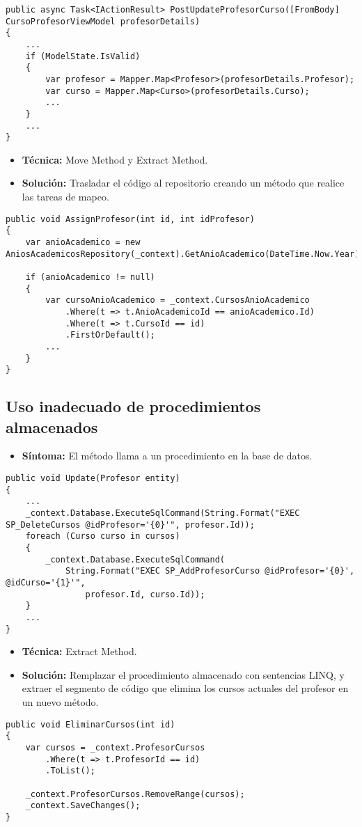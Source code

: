 \begin{lstlisting}[language={[Sharp]C}]
public async Task<IActionResult> PostUpdateProfesorCurso([FromBody] CursoProfesorViewModel profesorDetails)
{
	...
	if (ModelState.IsValid)
	{
		var profesor = Mapper.Map<Profesor>(profesorDetails.Profesor);
		var curso = Mapper.Map<Curso>(profesorDetails.Curso);
		...
	}
	...
}
\end{lstlisting}

\begin{itemize}
	\item \textbf{Técnica:} Move Method y Extract Method.
	\item \textbf{Solución:} Trasladar el código al repositorio creando un método que realice las tareas de mapeo.
\end{itemize}

\begin{lstlisting}[language={[Sharp]C}]
public void AssignProfesor(int id, int idProfesor)
{
	var anioAcademico = new AniosAcademicosRepository(_context).GetAnioAcademico(DateTime.Now.Year);

	if (anioAcademico != null)
	{
		var cursoAnioAcademico = _context.CursosAnioAcademico
			.Where(t => t.AnioAcademicoId == anioAcademico.Id)
			.Where(t => t.CursoId == id)
			.FirstOrDefault();	
		...
	}
}
\end{lstlisting}


\subsection{Uso inadecuado de procedimientos almacenados}
\begin{itemize}
	\item \textbf{Síntoma:} El método llama a un procedimiento en la base de datos.
\end{itemize}

\begin{lstlisting}[language={[Sharp]C}]
public void Update(Profesor entity)
{
	...
	_context.Database.ExecuteSqlCommand(String.Format("EXEC SP_DeleteCursos @idProfesor='{0}'", profesor.Id));
	foreach (Curso curso in cursos)
	{
    	_context.Database.ExecuteSqlCommand(
    		String.Format("EXEC SP_AddProfesorCurso @idProfesor='{0}', @idCurso='{1}'", 
    			profesor.Id, curso.Id));
	}
	...
}
\end{lstlisting}

\begin{itemize}
	\item \textbf{Técnica:} Extract Method.
	\item \textbf{Solución:} Remplazar el procedimiento almacenado con sentencias LINQ, y extraer el segmento de código que elimina los cursos actuales del profesor en un nuevo método.
\end{itemize}

\begin{lstlisting}[language={[Sharp]C}]
public void EliminarCursos(int id)
{
	var cursos = _context.ProfesorCursos
		.Where(t => t.ProfesorId == id)
		.ToList();
	
	_context.ProfesorCursos.RemoveRange(cursos);
	_context.SaveChanges();
}
\end{lstlisting}